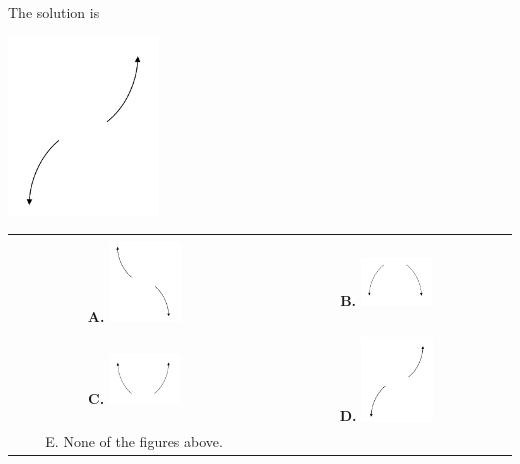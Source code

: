 \documentclass{extbook}[14pt]
\begin{document}
 
 The solution is  
 \begin{center} \includegraphics[width=0.3\textwidth]{../Figures/polyEndBehaviorDB.png} \end{center}\begin{tabular}{|c|c|} 
\hline 
 & \tabularnewline 
 \textbf{A.} \includegraphics[width=0.3\textwidth]{../Figures/polyEndBehaviorAB.png} & \textbf{B.} \includegraphics[width=0.3\textwidth]{../Figures/polyEndBehaviorBB.png} \tabularnewline 
\hline 
 & \tabularnewline 
 \textbf{C.} \includegraphics[width=0.3\textwidth]{../Figures/polyEndBehaviorCB.png} & \textbf{D.} \includegraphics[width=0.3\textwidth]{../Figures/polyEndBehaviorDB.png} \tabularnewline 
\hline 
 E. None of the figures above. & \tabularnewline 
\hline 
 \end{tabular} 
 
\end{document}
